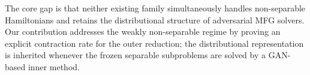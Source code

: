 \noindent The core gap is that neither existing family simultaneously handles
non-separable Hamiltonians and retains the distributional structure of
adversarial MFG solvers. Our contribution addresses the weakly
non-separable regime by proving an explicit contraction rate for the
outer reduction; the distributional representation is inherited whenever
the frozen separable subproblems are solved by a GAN-based inner method.
